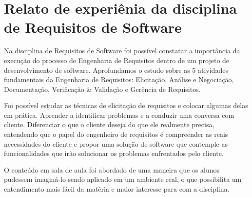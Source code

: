 \section{Relato de experiênia da disciplina de Requisitos de Software}
	Na disciplina de Requisitos de Software foi possível constatar a importância da execução do processo de Engenharia de Requisitos dentro de um projeto de desenvolvimento de software. Aprofundamos o estudo sobre as 5 atividades fundamentais da Engenharia de Requisitos: Elicitação, Análise e Negociação, Documentação, Verificação \& Validação e Gerência de Requisitos.

	Foi possível estudar as técnicas de elicitação de requisitos e colocar algumas delas em prática. Aprender a identificar problemas e a conduzir uma conversa com cliente. Diferenciar o que o cliente deseja do que ele realmente precisa, entendendo que o papel do engenheiro de requisitos é compreender as reais necessidades do cliente e propor uma solução de software que contemple as funcionalidades que irão solucionar os problemas enfrentados pelo cliente.

	O conteúdo em sala de aula foi abordado de uma maneira que os alunos pudessem imaginá-lo sendo aplicado em um ambiente real, o que possibilita um entendimento mais fácil da matéria e maior interesse para com a disciplina.